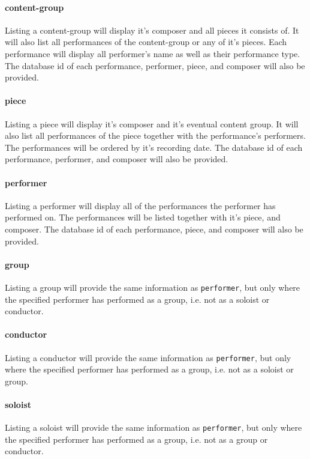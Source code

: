 \paragraph{content-group}
Listing a content-group will display it's composer and all pieces it consists of.
It will also list all performances of the content-group or any of it's pieces.
Each performance will display all performer's name as well as their performance type.
The database id of each performance, performer, piece, and composer will also be provided.

\paragraph{piece}
Listing a piece will display it's composer and it's eventual content group.
It will also list all performances of the piece together with the performance's performers.
The performances will be ordered by it's recording date.
The database id of each performance, performer, and composer will also be provided.

\paragraph{performer}
Listing a performer will display all of the performances the performer has performed on.
The performances will be listed together with it's piece, and composer.
The database id of each performance, piece, and composer will also be provided.

\paragraph{group}
Listing a group will provide the same information as \texttt{performer}, but only where the
specified performer has performed as a group, i.e. not as a soloist or conductor.

\paragraph{conductor}
Listing a conductor will provide the same information as \texttt{performer}, but only where the
specified performer has performed as a group, i.e. not as a soloist or group.

\paragraph{soloist}
Listing a soloist will provide the same information as \texttt{performer}, but only where the
specified performer has performed as a group, i.e. not as a group or conductor.

